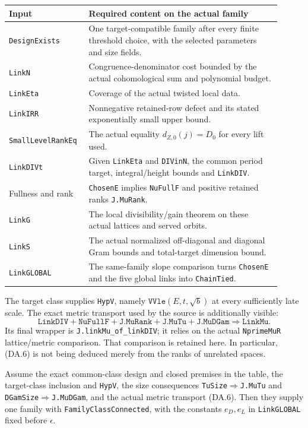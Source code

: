 \begin{center}\small
\begin{tabular}{p{0.24\linewidth}p{0.67\linewidth}}
\toprule
Input & Required content on the actual family\\
\midrule
\texttt{DesignExists} & One target-compatible family after every
finite threshold choice, with the selected parameters and size fields.\\
\texttt{LinkN} & Congruence-denominator cost bounded by the actual
cohomological sum and polynomial budget.\\
\texttt{LinkEta} & Coverage of the actual twisted local data.\\
\texttt{LinkIRR} & Nonnegative retained-row defect and its stated
exponentially small upper bound.\\
\texttt{SmallLevelRankEq} & The actual equality $d_{Z,0}(j)=D_0$
for every lift used.\\
\texttt{LinkDIVt} & Given \texttt{LinkEta} and \texttt{DIVinN}, the
common period target, integral/height bounds and \texttt{LinkDIV}.\\
Fullness and rank & \texttt{ChosenE} implies \texttt{NuFullF} and
positive retained ranks \texttt{J.MuRank}.\\
\texttt{LinkG} & The local divisibility/gain theorem on these actual
lattices and served orbits.\\
\texttt{LinkS} & The actual normalized off-diagonal and diagonal Gram
bounds and total-target dimension bound.\\
\texttt{LinkGLOBAL} & The same-family slope comparison turns
\texttt{ChosenE} and the five global links into \texttt{ChainTied}.\\
\bottomrule
\end{tabular}
\end{center}

The target class supplies \texttt{HypV}, namely
$\texttt{VVle}(E,t,\sqrt b)$ at every sufficiently late scale.
The exact metric transport used by the source is additionally visible:
\[
 \texttt{LinkDIV}+\texttt{NuFullF}+\texttt{J.MuRank}
 +\texttt{J.MuTu}+\texttt{J.MuDGam}
 \Longrightarrow\texttt{LinkMu}.                          \tag{DA.6}
\]
Its final wrapper is \texttt{J.linkMu\_of\_linkDIV}; it relies on the
actual \texttt{NprimeMuR} lattice/metric comparison.  That comparison
is retained here.  In particular, (DA.6) is not being deduced merely
from the ranks of unrelated spaces.

\begin{proposition}
\label{prop:da-topdeswin}
Assume the exact common-class design and closed premises in the table,
the target-class inclusion and \texttt{HypV}, the size consequences
\texttt{TuSize}$\Rightarrow$\texttt{J.MuTu} and
\texttt{DGamSize}$\Rightarrow$\texttt{J.MuDGam}, and the actual
metric transport (DA.6).  Then they supply one family with
\texttt{FamilyClassConnected}, with the constants $e_D,e_L$ in
\texttt{LinkGLOBAL} fixed before $\epsilon$.
\end{proposition}

